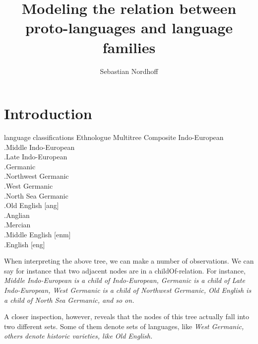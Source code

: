 \documentclass[a4paper,10pt]{article}
\title{Modeling the relation between proto-languages and language families}
\author{Sebastian Nordhoff}
\begin{document}
\maketitle

\begin{abstract}

\end{abstract}

\section{Introduction}

language classifications
    Ethnologue
    Multitree Composite
\ea
Indo-European \\
.\hspace{.2cm}Middle Indo-European \\
.\hspace{.4cm}Late Indo-European \\
.\hspace{.6cm}Germanic \\
.\hspace{.8cm}Northwest Germanic\\
.\hspace{1cm}West Germanic \\
.\hspace{1.2cm}North Sea Germanic \\
.\hspace{1.4cm}Old English [ang]\\
.\hspace{1.6cm}Anglian \\
.\hspace{1.8cm}Mercian \\
.\hspace{2cm}Middle English [enm]\\
.\hspace{2.2cm}English [eng]
\z

When interpreting the above tree, we can make a number of observations. We can say for instance that two adjacent nodes are in a childOf-relation. For instance, \em Middle Indo-European \em is a child of \em Indo-European\em, \em Germanic \em is a child of \em Late Indo-European\em, \em West Germanic \em is a child of \em Northwest Germanic\em, \em Old English \em is a child of \em North Sea Germanic\em, and so on.

A closer inspection, however, reveals that the nodes of this tree actually fall into two different sets. Some of them denote sets of languages, like \em West Germanic\em, others denote historic varieties, like \em Old English\em. 
\end{document}
